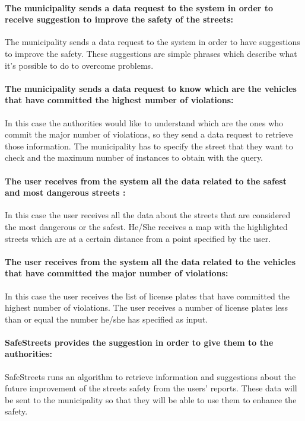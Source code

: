 \documentclass[titlepage]{article}
\begin{document}
\paragraph{The municipality sends a data request to the 				   system  in order to receive suggestion to improve 			   the 	safety 	of the streets: }
The municipality sends a data request to the system in order to have suggestions to improve the safety. These suggestions are simple phrases which describe what it's possible to do to overcome problems.
\paragraph{The municipality sends a data request to know which 		   are the vehicles that have committed the highest 	         		  number of violations: }
In this case the authorities would like to understand which are the ones who commit the major number of violations, so they send a data request to retrieve those information. The municipality has to specify the street that they want to check and the maximum number of instances to obtain with the query.
\paragraph{The user receives from the system all the data 			related to the safest and most dangerous streets : }
In this case the user receives all the data about the streets that are considered the most dangerous or the safest. He/She receives a map with the highlighted streets which are at a certain distance from a point specified by the user.
\paragraph{The user receives from the system all the data related to the vehicles that have committed the major number of violations:}
In this case the user receives the list of license plates that have committed the highest number of violations. The user receives a number of license plates less than or equal the number he/she has specified as input.
\paragraph{SafeStreets provides the suggestion in order to give them to the authorities: }
SafeStreets runs an algorithm to retrieve information and suggestions about the future improvement of the streets safety from the users' reports. These data will be sent to the municipality so that they will be able to use them to enhance the safety.
\end{document}
